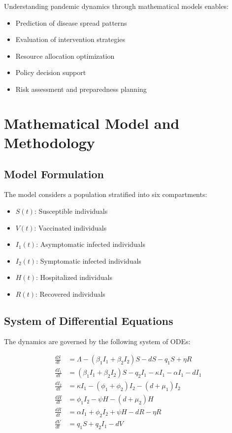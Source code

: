 \documentclass[12pt,a4paper]{report}
\begin{document}
Understanding pandemic dynamics through mathematical models enables:
\begin{itemize}
    \item Prediction of disease spread patterns
    \item Evaluation of intervention strategies
    \item Resource allocation optimization
    \item Policy decision support
    \item Risk assessment and preparedness planning
\end{itemize}

\chapter{Mathematical Model and Methodology}

\section{Model Formulation}

The model considers a population stratified into six compartments:
\begin{itemize}
    \item $S(t)$: Susceptible individuals
    \item $V(t)$: Vaccinated individuals
    \item $I_1(t)$: Asymptomatic infected individuals
    \item $I_2(t)$: Symptomatic infected individuals
    \item $H(t)$: Hospitalized individuals
    \item $R(t)$: Recovered individuals
\end{itemize}

\section{System of Differential Equations}

The dynamics are governed by the following system of ODEs:

\begin{equation}
\begin{aligned}
\frac{dS}{dt} &= \Lambda - (\beta_1 I_1 + \beta_2 I_2)S - dS - q_1 S + \eta R \\
\frac{dI_1}{dt} &= (\beta_1 I_1 + \beta_2 I_2)S - q_2 I_1 - \kappa I_1 - \alpha I_1 - d I_1 \\
\frac{dI_2}{dt} &= \kappa I_1 - (\phi_1 + \phi_2)I_2 - (d + \mu_1)I_2 \\
\frac{dH}{dt} &= \phi_1 I_2 - \psi H - (d + \mu_2)H \\
\frac{dR}{dt} &= \alpha I_1 + \phi_2 I_2 + \psi H - dR - \eta R \\
\frac{dV}{dt} &= q_1 S + q_2 I_1 - d V
\end{aligned}
\end{equation}
\end{document}
